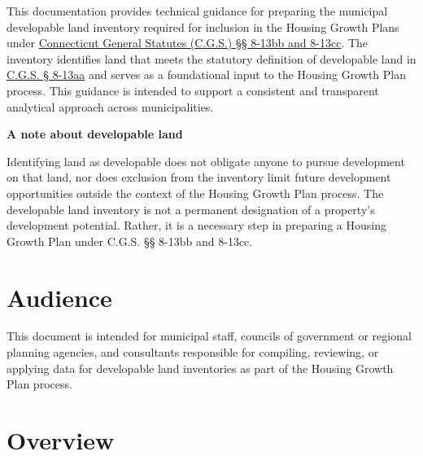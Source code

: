 \documentclass[
  letterpaper,
  DIV=11,
  numbers=noendperiod]{scrreprt}
\begin{document}
This documentation provides technical guidance for preparing the
municipal developable land inventory required for inclusion in the
Housing Growth Plans under
\href{https://cga.ct.gov/2026/sup/chap_124b.htm}{Connecticut General
Statutes (C.G.S.) §§ 8-13bb and 8-13cc}. The inventory identifies land
that meets the statutory definition of developable land in
\href{https://cga.ct.gov/2026/sup/chap_124b.htm\#sec_8-13aa}{C.G.S. §
8-13aa} and serves as a foundational input to the Housing Growth Plan
process. This guidance is intended to support a consistent and
transparent analytical approach across municipalities.

\begin{tcolorbox}[enhanced jigsaw, arc=.35mm, bottomrule=.15mm, breakable, colback=white, colframe=quarto-callout-note-color-frame, left=2mm, leftrule=.75mm, opacityback=0, rightrule=.15mm, toprule=.15mm]
\begin{minipage}[t]{5.5mm}
\textcolor{quarto-callout-note-color}{\faInfo}
\end{minipage}%
\begin{minipage}[t]{\textwidth - 5.5mm}

\vspace{-3mm}\textbf{A note about developable land}\vspace{3mm}

Identifying land as developable does not obligate anyone to pursue
development on that land, nor does exclusion from the inventory limit
future development opportunities outside the context of the Housing
Growth Plan process. The developable land inventory is not a permanent
designation of a property's development potential. Rather, it is a
necessary step in preparing a Housing Growth Plan under C.G.S. §§ 8-13bb
and 8-13cc.

\end{minipage}%
\end{tcolorbox}

\section{Audience}\label{audience}

This document is intended for municipal staff, councils of government or
regional planning agencies, and consultants responsible for compiling,
reviewing, or applying data for developable land inventories as part of
the Housing Growth Plan process.

\section{Overview}\label{overview}
\end{document}
